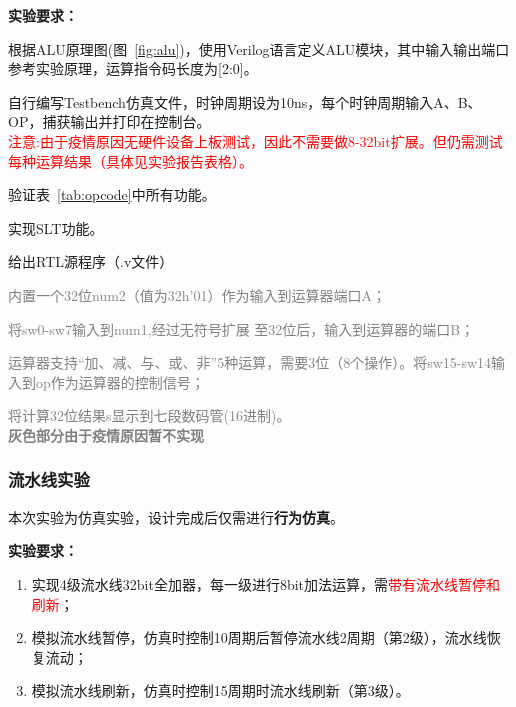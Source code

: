 \textbf{实验要求：}
\begin{enumerate}
    \item 根据ALU原理图(图~\ref{fig:alu})，使用Verilog语言定义ALU模块，其中输入输出端口参考实验原理，运算指令码长度为[2:0]。
    \item 自行编写Testbench仿真文件，时钟周期设为10ns，每个时钟周期输入A、B、OP，捕获输出并打印在控制台。\\
        \textcolor{red}{注意:由于疫情原因无硬件设备上板测试，因此不需要做8-32bit扩展。但仍需测试每种运算结果（具体见实验报告表格）。}
    \item 验证表~\ref{tab:opcode}中所有功能。
    \item 实现SLT功能。
    \item 给出RTL源程序（.v文件）
    
    \textcolor{gray}{
    \item 内置一个32位num2（值为32h’01）作为输入到运算器端口A；
    \item 将sw0-sw7输入到num1,经过无符号扩展 至32位后，输入到运算器的端口B；
    \item 运算器支持“加、减、与、或、非”5种运算，需要3位（8个操作）。将sw15-sw14输入到op作为运算器的控制信号；
    \item 将计算32位结果s显示到七段数码管(16进制)。\\     
        \textbf{灰色部分由于疫情原因暂不实现}
    }

\end{enumerate}

\subsubsection{流水线实验}

本次实验为仿真实验，设计完成后仅需进行\textbf{行为仿真}。

\textbf{实验要求：}



\begin{enumerate}
    \item 实现4级流水线32bit全加器，每一级进行8bit加法运算，需\textcolor{red}{带有流水线暂停和刷新}；
    \item 模拟流水线暂停，仿真时控制10周期后暂停流水线2周期（第2级），流水线恢复流动；
    \item 模拟流水线刷新，仿真时控制15周期时流水线刷新（第3级）。

\end{enumerate}

